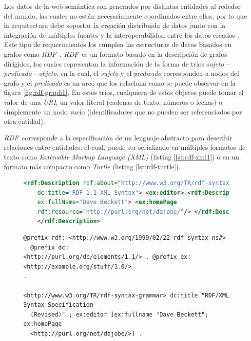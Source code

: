 \documentclass[conference,compsoc]{IEEEtran}
\newcommand{\rdf}{\textit{RDF}\ } \newcommand{\spql}{\texttt{SPARQL}\ }
\begin{document}
Los datos de la web semántica son generados por distintas entidades al rededor
del mundo, las cuales no están necesariamente coordinados entre ellos, por lo
que la arquitectura debe soportar la creación distribuida de datos junto con la
integración de múltiples fuentes y la interoperabilidad entre los datos creados
\cite{bizer2011linked}. Este tipo de requerimientos los cumplen las estructuras
de datos basados en grafos como \rdf. \rdf es un formato basado en la
descripción de grafos dirigidos, los cuales representan la información de la
forma de tríos \textit{sujeto - predicado - objeto}, en la cual, el
\textit{sujeto} y el \textit{predicado} corresponden a nodos del grafo y el
\textit{predicado} es un arco que los relaciona como se puede observar en la
figura \ref{fig:rdf-graph1}. En estos tríos, cualquiera de estos objetos puede
tomar el valor de una \textit{URI}, un valor literal (cadenas de texto, números
o fechas) o simplemente un nodo vacío (identificadores que no pueden ser
referenciados por otra entidad).

\rdf corresponde a la especificación de un lenguaje abstracto para describir
relaciones entre entidades, el cual, puede ser serializado en múltiples formatos
de texto como \textit{Extensible Markup Language (XML)} \cite{beckett2004rdf}
(listing \ref{lst:rdf-xml1}) o en un formato más compacto como \textit{Turtle}
\cite{beckett2014rdf} (listing \ref{lst:rdf-turtle}).

\begin{figure}
    \begin{lstlisting}[language=xml, captionpos=b, caption=Descripción de un documento en \textit{RDF/XML}, label=lst:rdf-xml1, basicstyle=\ttfamily, frame=single]
<rdf:Description rdf:about="http://www.w3.org/TR/rdf-syntax-grammar"
    dc:title="RDF 1.1 XML Syntax"> <ex:editor> <rdf:Description
    ex:fullName="Dave Beckett"> <ex:homePage
    rdf:resource="http://purl.org/net/dajobe/"/> </rdf:Description> </ex:editor>
    </rdf:Description>
    \end{lstlisting}
\end{figure}

\begin{figure}
    \begin{lstlisting}[captionpos=b, caption=Descripción de un documento en \textit{RDF/Turtle}, label=lst:rdf-turtle, basicstyle=\ttfamily, frame=single]
@prefix rdf: <http://www.w3.org/1999/02/22-rdf-syntax-ns#> . @prefix dc:
<http://purl.org/dc/elements/1.1/> . @prefix ex: <http://example.org/stuff/1.0/>
.

<http://www.w3.org/TR/rdf-syntax-grammar> dc:title "RDF/XML Syntax Specification
  (Revised)" ; ex:editor [ex:fullname "Dave Beckett"; ex:homePage
  <http://purl.org/net/dajobe/>] .
    \end{lstlisting}
\end{figure}
\end{document}
